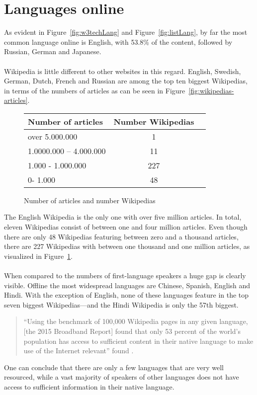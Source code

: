 \section{Languages online}

As evident in Figure~\ref{fig:w3techLang} and Figure~\ref{fig:listLang}, by far the most common language online is English, with 53.8\% of the content,  followed by Russian, German and Japanese. \citep{w3techLang} \\
\\
Wikipedia is little different to other websites in this regard. English, Swedish, German, Dutch, French and Russian are among the top ten biggest Wikipedias, in terms of the numbers of articles as can be seen in Figure~\ref{fig:wikipedias-articles}. \\
\begin{figure}[H]
\begin{center}
	\begin{tabular}{| l | c | r |}
		\hline			
		Number of articles & Number Wikipedias \\ \hline
		over 5.000.000 & 1 \\
		1.0000.000 -- 4.000.000 & 11 \\
		1.000 - 1.000.000 & 227 \\
		0- 1.000 & 48 \\
		\hline  
	\end{tabular}
	\end{center}
	\caption{Number of articles and number Wikipedias}
	\label{fig:tableNumWP}
\end{figure}
The English Wikipedia is the only one with over five million articles. In total, eleven Wikipedias consist of between one and four million articles. Even though there are only 48 Wikipedias featuring between zero and a thousand articles, there are 227 Wikipedias with between one thousand and one million articles, as visualized in Figure~\ref{fig:tableNumWP}. \citep{wiki:30} \\
\\
When compared to the numbers of first-language speakers a huge gap is clearly visible. Offline the most widespread languages are Chinese, Spanish, English and Hindi. With the exception of English, none of these languages feature in the top seven biggest Wikipedias---and the Hindi Wikipedia is only the 57th biggest.
\begin{quote}
``Using the benchmark of 100,000 Wikipedia pages in any given language, [the 2015 Broadband Report] found that only 53 percent of the world's population has access to sufficient content in their native language to make use of the Internet relevant'' found \citet{atlanticLang}.
\end{quote}
One can conclude that there are only a few languages that are very well resourced, while a vast majority of speakers of other languages does not have access to sufficient information in their native language.